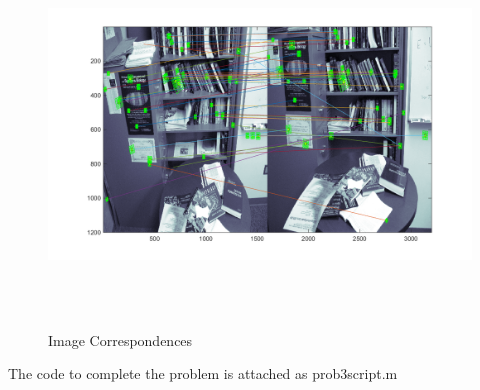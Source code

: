 \documentclass[11pt,psfig]{article}
\begin{document}
\begin{figure}[H]
\centering
\includegraphics[height=4in]{prob3matches.png}
\caption{Image Correspondences}
\label{p3}
\end{figure}
      
The code to complete the problem is attached as prob3script.m   
        
\end{document}
